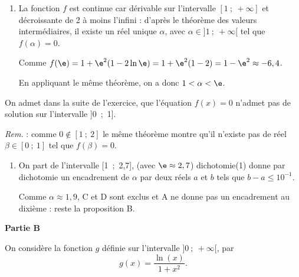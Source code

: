 \begin{enumerate}
\item 
La fonction $f$ est continue car dérivable sur l'intervalle $[1~;~+ \infty]$ et décroissante de 2 à moins l'infini : d'après le théorème des valeurs intermédiaires, il existe un réel unique $\alpha$, avec $\alpha \in ]1~;~+ \infty[$ tel que $f(\alpha) = 0$.

Comme $f(\e) = 1 + \e^2(1 - 2\ln \e) = 1 + \e^2(1 - 2) = 1 - \e^2 \approx - 6,4$.

En appliquant le même théorème, on a donc $1 < \alpha < \e$.
\end{enumerate}

On admet dans la suite de l'exercice, que l'équation $f(x) = 0$ n'admet pas de solution sur l'intervalle ]0~;~1].

\emph{Rem. } : comme $0 \notin [1~;~2]$ le même théorème montre qu'il n'existe pas de réel $\beta \in [0~;~1]$ tel que $f(\beta) = 0$.

\begin{enumerate}[resume]
\item 










































On part de l'intervalle [1~;~2,7], (avec $\e \approx 2,7$)
{\ttfamily dichotomie(1)} donne par dichotomie un encadrement de $\alpha$ par deux réels $a$ et $b$ tels que $b - a \leqslant 10^{-1}$.

Comme $\alpha \approx 1,9$, C et D sont exclus et A ne donne pas un encadrement au dixième : reste la proposition B.
\end{enumerate}

\bigskip

\textbf{Partie B}

\medskip

On considère la fonction $g$ définie sur l'intervalle $]0~;~+ \infty[$, par 
\[g(x) = \dfrac{\ln (x)}{1 + x^2}.\]

